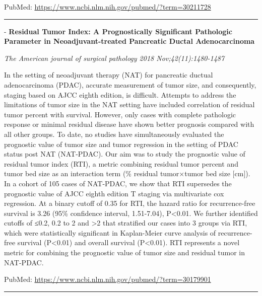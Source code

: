 \documentclass[]{article}
\begin{document}
PubMed: \url{https://www.ncbi.nlm.nih.gov/pubmed/?term=30211728}

{}

{}

\begin{center}\rule{0.5\linewidth}{\linethickness}\end{center}

 - \textbf{Residual Tumor Index: A Prognostically Significant Pathologic
Parameter in Neoadjuvant-treated Pancreatic Ductal Adenocarcinoma}

\emph{The American journal of surgical pathology 2018
Nov;42(11):1480-1487}

In the setting of neoadjuvant therapy (NAT) for pancreatic ductual
adenocarcinoma (PDAC), accurate measurement of tumor size, and
consequently, staging based on AJCC eighth edition, is difficult.
Attempts to address the limitations of tumor size in the NAT setting
have included correlation of residual tumor percent with survival.
However, only cases with complete pathologic response or minimal
residual disease have shown better prognosis compared with all other
groups. To date, no studies have simultaneously evaluated the prognostic
value of tumor size and tumor regression in the setting of PDAC status
post NAT (NAT-PDAC). Our aim was to study the prognostic value of
residual tumor index (RTI), a metric combining residual tumor percent
and tumor bed size as an interaction term (\% residual tumor×tumor bed
size {[}cm{]}). In a cohort of 105 cases of NAT-PDAC, we show that RTI
supersedes the prognostic value of AJCC eighth edition T staging via
multivariate cox regression. At a binary cutoff of 0.35 for RTI, the
hazard ratio for recurrence-free survival is 3.26 (95\% confidence
interval, 1.51-7.04), P\textless{}0.01. We further identified cutoffs of
≤0.2, 0.2 to 2 and \textgreater{}2 that stratified our cases into 3
groups via RTI, which were statistically significant in Kaplan-Meier
curve analysis of recurrence-free survival (P\textless{}0.01) and
overall survival (P\textless{}0.01). RTI represents a novel metric for
combining the prognostic value of tumor size and residual tumor in
NAT-PDAC.

PubMed: \url{https://www.ncbi.nlm.nih.gov/pubmed/?term=30179901}

{}

{}

\begin{center}\rule{0.5\linewidth}{\linethickness}\end{center}
\end{document}
